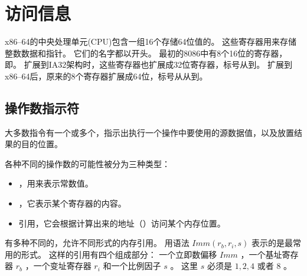 
\section{访问信息}
{
    x86--64的中央处理单元(CPU)包含一组16个存储64位值的。
    这些寄存器用来存储整数数据和指针。
    它们的名字都以开头。
    最初的8086中有8个16位的寄存器，即。
    扩展到IA32架构时，这些寄存器也扩展成32位寄存器，标号从到。
    扩展到x86--64后，原来的8个寄存器扩展成64位，标号从从到。

    \subsection{操作数指示符}
    {
        大多数指令有一个或多个，指示出执行一个操作中要使用的源数据值，以及放置结果的目的位置。

        各种不同的操作数的可能性被分为三种类型：

        \begin{itemize}
            \item {}，用来表示常数值。
            \item {}，它表示某个寄存器的内容。
            \item {}引用，它会根据计算出来的地址（）访问某个内存位置。
        \end{itemize}

        有多种不同的，允许不同形式的内存引用。
        用语法 $Imm(r_b, r_i, s)$ 表示的是最常用的形式。
        这样的引用有四个组成部分：
        一个立即数偏移 $Imm$ ，一个基址寄存器 $r_b$ ，一个变址寄存器 $r_i$ 和一个比例因子 $s$ 。
        这里 $s$ 必须是 $1, 2, 4$ 或者 $8$ 。

}}

